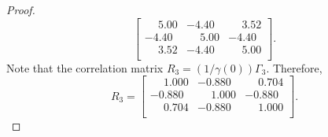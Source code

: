 \documentclass[12pt]{article}
\theoremstyle{definition}
\begin{document}
\begin{proof}
\[\begin{bmatrix}
      \phantom{-}5.00  & -4.40 & \phantom{-}3.52 \\
      -4.40 & \phantom{-}5.00  & -4.40  \\
      \phantom{-}3.52 & -4.40 & \phantom{-}5.00  \\
    \end{bmatrix}.
  \]
  Note that the correlation matrix $R_3 = (1/\gamma(0))\Gamma_3$. Therefore,
  \[
    R_3 =
    \begin{bmatrix}
      \phantom{-}1.000  & -0.880 & \phantom{-}0.704 \\
      -0.880 & \phantom{-}1.000  & -0.880  \\
      \phantom{-}0.704 & -0.880 & \phantom{-}1.000  \\
    \end{bmatrix}.
  \]

\end{proof}
\end{document}
